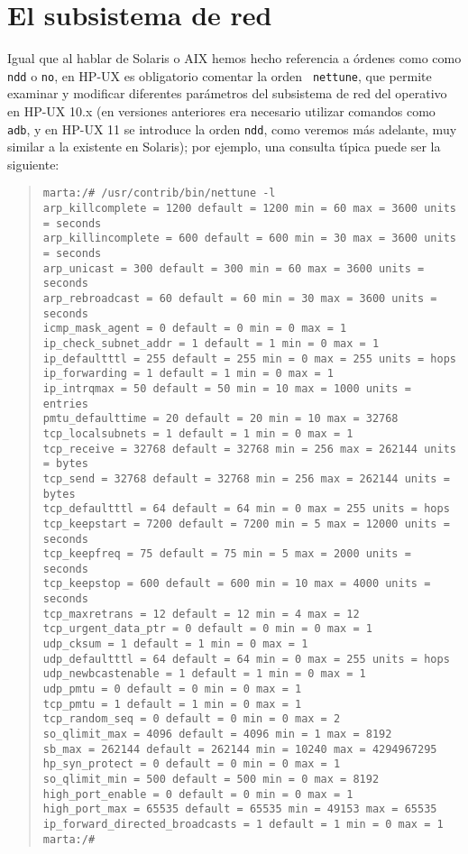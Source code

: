 \section{El subsistema de red}
Igual que al hablar de Solaris o AIX hemos hecho referencia a \'ordenes como
como {\tt ndd} o {\tt no}, en HP-UX es obligatorio comentar la orden {\tt 
nettune}, que permite examinar y modificar diferentes par\'ametros del 
subsistema de red del operativo en HP-UX 10.x (en versiones anteriores era
necesario utilizar comandos como {\tt adb}, y en HP-UX 11 se introduce la orden
{\tt ndd}, como veremos m\'as adelante, muy similar a la existente en Solaris); 
por ejemplo, una consulta t\'{\i}pica puede ser la siguiente:
\begin{quote}
\begin{verbatim}
marta:/# /usr/contrib/bin/nettune -l
arp_killcomplete = 1200 default = 1200 min = 60 max = 3600 units = seconds
arp_killincomplete = 600 default = 600 min = 30 max = 3600 units = seconds
arp_unicast = 300 default = 300 min = 60 max = 3600 units = seconds
arp_rebroadcast = 60 default = 60 min = 30 max = 3600 units = seconds
icmp_mask_agent = 0 default = 0 min = 0 max = 1
ip_check_subnet_addr = 1 default = 1 min = 0 max = 1
ip_defaultttl = 255 default = 255 min = 0 max = 255 units = hops
ip_forwarding = 1 default = 1 min = 0 max = 1
ip_intrqmax = 50 default = 50 min = 10 max = 1000 units = entries
pmtu_defaulttime = 20 default = 20 min = 10 max = 32768
tcp_localsubnets = 1 default = 1 min = 0 max = 1
tcp_receive = 32768 default = 32768 min = 256 max = 262144 units = bytes
tcp_send = 32768 default = 32768 min = 256 max = 262144 units = bytes
tcp_defaultttl = 64 default = 64 min = 0 max = 255 units = hops
tcp_keepstart = 7200 default = 7200 min = 5 max = 12000 units = seconds
tcp_keepfreq = 75 default = 75 min = 5 max = 2000 units = seconds
tcp_keepstop = 600 default = 600 min = 10 max = 4000 units = seconds
tcp_maxretrans = 12 default = 12 min = 4 max = 12
tcp_urgent_data_ptr = 0 default = 0 min = 0 max = 1
udp_cksum = 1 default = 1 min = 0 max = 1
udp_defaultttl = 64 default = 64 min = 0 max = 255 units = hops
udp_newbcastenable = 1 default = 1 min = 0 max = 1
udp_pmtu = 0 default = 0 min = 0 max = 1
tcp_pmtu = 1 default = 1 min = 0 max = 1
tcp_random_seq = 0 default = 0 min = 0 max = 2
so_qlimit_max = 4096 default = 4096 min = 1 max = 8192
sb_max = 262144 default = 262144 min = 10240 max = 4294967295
hp_syn_protect = 0 default = 0 min = 0 max = 1
so_qlimit_min = 500 default = 500 min = 0 max = 8192
high_port_enable = 0 default = 0 min = 0 max = 1
high_port_max = 65535 default = 65535 min = 49153 max = 65535
ip_forward_directed_broadcasts = 1 default = 1 min = 0 max = 1
marta:/#
\end{verbatim}
\end{quote}
